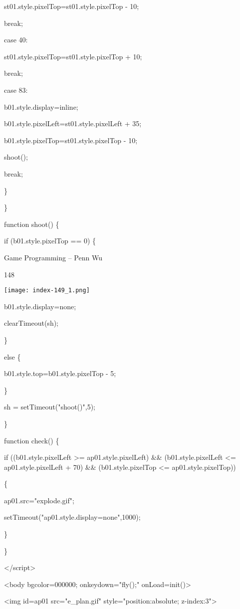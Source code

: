 \documentclass[
]{article}
\begin{document}
st01.style.pixelTop=st01.style.pixelTop - 10;

break;

case 40:

st01.style.pixelTop=st01.style.pixelTop + 10;

break;

case 83:

b01.style.display=\textquotesingle inline\textquotesingle;

b01.style.pixelLeft=st01.style.pixelLeft + 35;

b01.style.pixelTop=st01.style.pixelTop - 10;

shoot();

break;

\}

\}

function shoot() \{

if (b01.style.pixelTop == 0) \{

Game Programming -- Penn Wu

148

\protect\hypertarget{index_split_009.htmlux5cux23p149}{}{}\texttt{[image: index-149\_1.png]}

b01.style.display=\textquotesingle none\textquotesingle;

clearTimeout(sh);

\}

else \{

b01.style.top=b01.style.pixelTop - 5;

\}

sh = setTimeout("shoot()",5);

\}

function check() \{

if ((b01.style.pixelLeft \textgreater= ap01.style.pixelLeft) \&\&
(b01.style.pixelLeft \textless= ap01.style.pixelLeft + 70) \&\&
(b01.style.pixelTop \textless= ap01.style.pixelTop))

\{

ap01.src="explode.gif";

setTimeout("ap01.style.display=\textquotesingle none\textquotesingle",1000);

\}

\}

\textless/script\textgreater{}

\textless body bgcolor=000000; onkeydown="fly();"
onLoad=init()\textgreater{}

\textless img id=ap01 src="e\_plan.gif" style="position:absolute;
z-index:3"\textgreater{}
\end{document}
